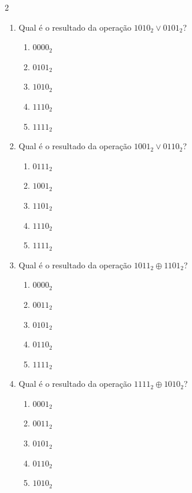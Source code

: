 \documentclass[a4paper,12pt]{article}
\begin{document}
\begin{multicols}{2}
\begin{enumerate}[leftmargin=*]
\item Qual é o resultado da operação
$1010_2 \lor 0101_2$?

\begin{enumerate}[label=(\Alph*)]
    \item $0000_2$
    \item $0101_2$
    \item $1010_2$
    \item $1110_2$
    \item $1111_2$
\end{enumerate}

\vspace{0.2cm}


\item Qual é o resultado da operação
$1001_2 \lor 0110_2$?

\begin{enumerate}[label=(\Alph*)]
    \item $0111_2$
    \item $1001_2$
    \item $1101_2$
    \item $1110_2$
    \item $1111_2$
\end{enumerate}

\vspace{0.2cm}



\item Qual é o resultado da operação
$1011_2 \oplus 1101_2$?

\begin{enumerate}[label=(\Alph*)]
    \item $0000_2$
    \item $0011_2$
    \item $0101_2$
    \item $0110_2$
    \item $1111_2$
\end{enumerate}

\vspace{0.2cm}


\item Qual é o resultado da operação
$1111_2 \oplus 1010_2$?

\begin{enumerate}[label=(\Alph*)]
    \item $0001_2$
    \item $0011_2$
    \item $0101_2$
    \item $0110_2$
    \item $1010_2$
\end{enumerate}


\end{enumerate}
\end{multicols}
\end{document}
